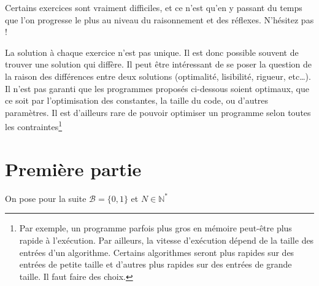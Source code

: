 \documentclass[../main.tex]{subfiles}
\begin{document}
Certains exercices sont vraiment difficiles, et ce n'est qu'en y passant du temps que l'on progresse le plus au niveau du raisonnement et des réflexes. N'hésitez pas !
 
La solution à chaque exercice n'est pas unique. Il est donc possible souvent de trouver une solution qui diffère. Il peut être intéressant de se poser la question de la raison des différences entre deux solutions (optimalité, lisibilité, rigueur, etc\dots). Il n'est pas garanti que les programmes proposés ci-dessous soient optimaux, que ce soit par l'optimisation des constantes, la taille du code, ou d'autres paramètres. Il est d'ailleurs rare de pouvoir optimiser un programme selon toutes les contraintes\footnote{Par exemple, un programme parfois plus gros en mémoire peut-être plus rapide à l'exécution. Par ailleurs, la vitesse d'exécution dépend de la taille des entrées d'un algorithme. Certains algorithmes seront plus rapides sur des entrées de petite taille et d'autres plus rapides sur des entrées de grande taille. Il faut faire des choix.}
\section{Première partie}
On pose pour la suite $\mathcal{B} = \{0, 1\}$ et $N\in\mathbb{N}^{*}$
\end{document}
